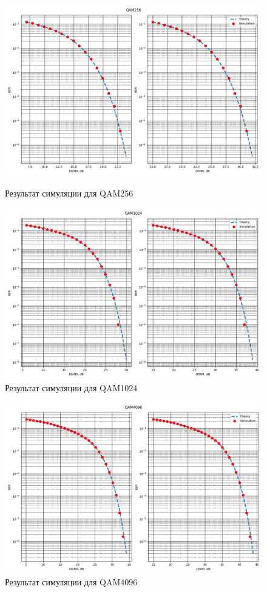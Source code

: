 \documentclass[a4paper, 14pt]{extarticle}
\begin{document}
\begin{figure}[]
	\centering
    \includegraphics[width=1\textwidth]{QAM256.png}
    \caption{Результат симуляции для QAM256}
    \label{fig:qam256}
	\centering
    \includegraphics[width=1\textwidth]{QAM1024.png}
    \caption{Результат симуляции для QAM1024}
    \label{fig:qam1024}
\end{figure}
\begin{figure}[]
	\centering
    \includegraphics[width=1\textwidth]{QAM4096.png}
    \caption{Результат симуляции для QAM4096}
    \label{fig:qam4096}
\end{figure}
\end{document}
